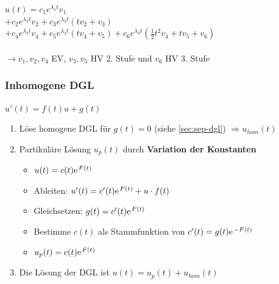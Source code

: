 \documentclass[6pt,a4paper]{scrartcl}
\renewcommand{\emph}[1]{\textbf{#1}}                                                            %
\newcommand{\ra}[0]{\ensuremath{\rightarrow}}                                  %
\begin{document}
\begin{multicols*}{4}
        $u (t) = c_1 e^{\lambda_1 t} v_1$ \\
        $+ c_2 e^{\lambda_2 t} v_2 + c_3 e^{\lambda_2 t}(tv_2 + v_3)$ \\
        $+ c_4 e^{\lambda_3 t} v_4 + c_5 e^{\lambda_3 t}(tv_4 + v_5) + c_6 e^{\lambda_3 t} (\frac{1}{2} t^2 v_4 + tv_5 + v_6)$ \\
        \\ \ra  $v_1, v_2, v_4$ EV, $v_3, v_5$ HV 2. Stufe und $v_6$ HV 3. Stufe
    \fi
    \subsubsection{Inhomogene DGL}
    $\boxed{u'(t) = f(t)u + g(t)}$

    \begin{enumerate}
        \itemsep0pt 
        \item Löse homogene DGL für $g(t) = 0$ (siehe \ref{sec:sep-dgl}) $\Rightarrow u_{hom}(t)$
        \item Partikuläre Lösung $u_p(t)$ durch \emph{Variation der Konstanten}
              \begin{itemize}\itemsep0pt 
                  \item $u(t) = c(t) \e^{F(t)}$
                  \item Ableiten: $u'(t) = c'(t)\e^{F(t)}+u\cdot f(t)$
                  \item Gleichsetzen: $g(t) = c'(t)\e^{F(t)}$
                  \item Bestimme $c(t)$ als Stammfunktion von $c'(t) = g(t)\e^{-F(t)}$
                  \item $u_p(t) = c(t)\e^{F(t)}$
              \end{itemize}
        \item Die Lösung der DGL ist $u(t) = u_p(t) + u_{hom}(t)$
    \end{enumerate}


\end{multicols*}
\end{document}
